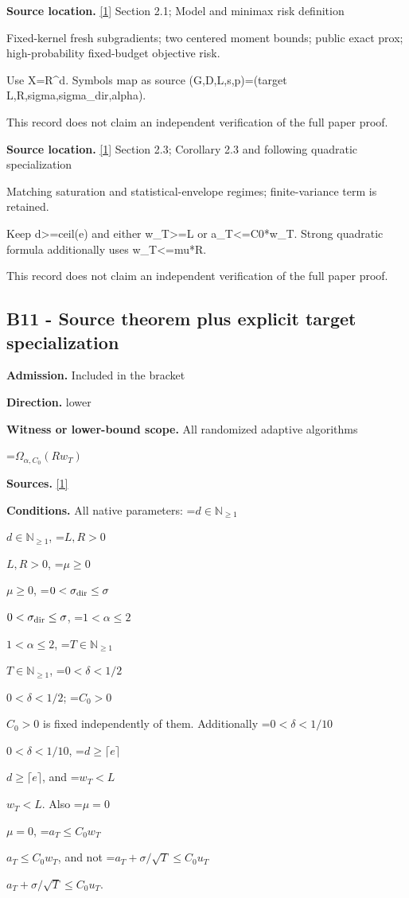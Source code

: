 \documentclass[10pt,a4paper]{article}
\newcommand{\AtlasMath}[1]{\par\begingroup\centering\setbox0=\hbox{$\displaystyle #1$}\ifdim\wd0>1.4\linewidth\typeout{ATLAS WIDE FORMULA: \the\wd0}\fi\ifdim\wd0>\linewidth\resizebox{\linewidth}{!}{\box0}\else\box0\fi\par\endgroup}
\newcommand{\AtlasInlineMath}[1]{\begingroup\setbox0=\hbox{$#1$}\ifdim\wd0>.4\linewidth\endgroup\AtlasMath{#1}\else\endgroup$#1$\fi}
\begin{document}
\textbf{Source location.} \href{https://arxiv.org/html/2610.00260v2}{[1]} Section 2.1; Model and minimax risk definition



Fixed-kernel fresh subgradients; two centered moment bounds; public exact prox; high-probability fixed-budget objective risk.



Use X=R\textasciicircum{}d. Symbols map as source (G,D,L,s,p)=(target L,R,sigma,sigma\_dir,alpha).



This record does not claim an independent verification of the full paper proof.



\textbf{Source location.} \href{https://arxiv.org/html/2610.00260v2}{[1]} Section 2.3; Corollary 2.3 and following quadratic specialization



Matching saturation and statistical-envelope regimes; finite-variance term is retained.



Keep d>=ceil(e) and either w\_T>=L or a\_T<=C0*w\_T. Strong quadratic formula additionally uses w\_T<=mu*R.



This record does not claim an independent verification of the full paper proof.



\subsection{B11 - Source theorem plus explicit target specialization}


\textbf{Admission.} Included in the bracket



\textbf{Direction.} lower



\textbf{Witness or lower-bound scope.} All randomized adaptive algorithms



\AtlasMath{\Omega_{\alpha,C_0}\!\left(Rw_T\right)}


\textbf{Sources.} \href{https://arxiv.org/html/2610.00260v2}{[1]}



\textbf{Conditions.} All native parameters: \AtlasInlineMath{d\in\mathbb N_{\ge1}}, \AtlasInlineMath{L,R>0}, \AtlasInlineMath{\mu\ge0}, \AtlasInlineMath{0<\sigma_{\rm dir}\le\sigma}, \AtlasInlineMath{1<\alpha\le2}, \AtlasInlineMath{T\in\mathbb N_{\ge1}}, \AtlasInlineMath{0<\delta<1/2}; \AtlasInlineMath{C_0>0} is fixed independently of them. Additionally \AtlasInlineMath{0<\delta<1/10}, \AtlasInlineMath{d\ge\lceil e\rceil}, and \AtlasInlineMath{w_T<L}. Also \AtlasInlineMath{\mu=0}, \AtlasInlineMath{a_T\le C_0w_T}, and not \AtlasInlineMath{a_T+\sigma/\sqrt T\le C_0u_T}.
\end{document}
